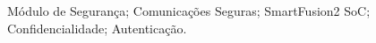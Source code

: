 \noindent Módulo de Segurança; Comunicações Seguras; SmartFusion2 SoC; Confidencialidade; Autenticação.
